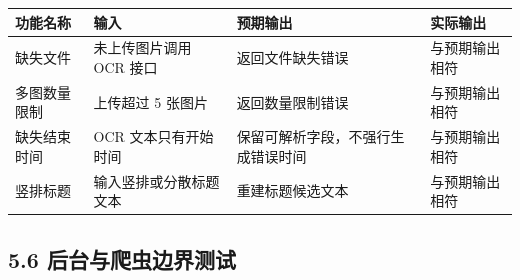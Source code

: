 {\def\LTcaptype{none} %
\begin{longtable}[]{@{}|
  >{\raggedright\arraybackslash}p{}|
  >{\raggedright\arraybackslash}p{}|
  >{\raggedright\arraybackslash}p{}|
  >{\raggedright\arraybackslash}p{}|@{}}
\hline
\rowcolor{gray!12}
\begin{minipage}[b]{\linewidth}\raggedright
\bfseries 功能名称
\end{minipage} & \begin{minipage}[b]{\linewidth}\raggedright
\bfseries 输入
\end{minipage} & \begin{minipage}[b]{\linewidth}\raggedright
\bfseries 预期输出
\end{minipage} & \begin{minipage}[b]{\linewidth}\raggedright
\bfseries 实际输出
\end{minipage} \\
\hline
\endhead
\hline
\endlastfoot
缺失文件 & 未上传图片调用 OCR 接口 & 返回文件缺失错误 &
与预期输出相符 \\
\hline
多图数量限制 & 上传超过 5 张图片 & 返回数量限制错误 & 与预期输出相符 \\
\hline
缺失结束时间 & OCR 文本只有开始时间 & 保留可解析字段，不强行生成错误时间
& 与预期输出相符 \\
\hline
竖排标题 & 输入竖排或分散标题文本 & 重建标题候选文本 & 与预期输出相符 \\
\hline
\end{longtable}
}

\subsection{5.6
后台与爬虫边界测试}\label{ux540eux53f0ux4e0eux722cux866bux8fb9ux754cux6d4bux8bd5}

